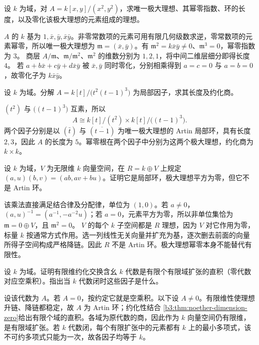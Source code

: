 \begin{exercise}\label{b3:ex:03-artin-square-example}
	设 \(k\) 为域，对 \(A=k[x,y]/(x^2,y^2)\)，求唯一极大理想、其幂零指数、环的长度，以及零化该极大理想的元素组成的理想。
\end{exercise}
\begin{solution}
	\(A\) 的 \(k\) 基为 \(1,\bar x,\bar y,\bar x\bar y\)。非零常数项的元素可用有限几何级数求逆，零常数项的元素幂零，所以唯一极大理想为 \(\mathfrak m=(\bar x,\bar y)\)。有 \(\mathfrak m^2=k\bar x\bar y\ne0\)、\(\mathfrak m^3=0\)，幂零指数为 \(3\)。 商层 \(A/\mathfrak m\)、\(\mathfrak m/\mathfrak m^2\)、\(\mathfrak m^2\) 的维数分别为 \(1,2,1\)，将中间二维层细分即得长度 \(4\)。 若 \(a+b\bar x+c\bar y+d\bar x\bar y\) 被 \(\bar x,\bar y\) 同时零化，分别相乘得到 \(a=c=0\) 与 \(a=b=0\)，故零化子为 \(k\bar x\bar y\)。
\end{solution}

\begin{exercise}\label{b3:ex:03-polynomial-artin-product}
	设 \(k\) 为域。分解 \(A=k[t]/\bigl(t^2(t-1)^3\bigr)\) 为局部因子，求其长度及约化商。
\end{exercise}
\begin{solution}
	\((t^2)\) 与 \(\bigl((t-1)^3\bigr)\) 互素，所以
	\[
		A\cong k[t]/(t^2)\times k[t]/\bigl((t-1)^3\bigr).
	\]
	两个因子分别是以 \((\bar t)\) 与 \((\overline{t-1})\) 为唯一极大理想的 Artin 局部环，具有长度 \(2,3\)，因此 \(A\) 的长度为 \(5\)。幂零根在两个因子中分别为这两个极大理想，约化商为 \(k\times k\)。
\end{solution}

\begin{exercise}\label{b3:ex:03-nilpotent-maximal-not-artin}
	设 \(k\) 为域，\(V\) 为无限维 \(k\) 向量空间，在 \(R=k\oplus V\) 上规定 \((a,u)(b,v)=(ab,av+bu)\)。证明它是局部环，极大理想平方为零，但它不是 Artin 环。
\end{exercise}
\begin{solution}
	该乘法直接满足结合律及分配律，单位为 \((1,0)\)。若 \(a\ne0\)， \((a,u)^{-1}=(a^{-1},-a^{-2}u)\)；若 \(a=0\)，元素平方为零，所以非单位集恰为 \(\mathfrak m=0\oplus V\)，且 \(\mathfrak m^2=0\)。 \(V\) 的每个 \(k\) 子空间都是 \(R\) 理想，因为 \(V\) 对它作用为零，标量 \(k\) 按通常方式作用。选一列线性无关向量并扩充为基，逐次删去前面的向量所得子空间构成严格降链。因此 \(R\) 不是 Artin 环。极大理想幂零本身不能替代有限性。
\end{solution}

\begin{exercise}\label{b3:ex:03-zero-dimensional-reduced}
	设 \(k\) 为域。证明有限维约化交换含幺 \(k\) 代数是有限个有限域扩张的直积（零代数对应空乘积）。指出当 \(k\) 代数闭时这些因子是什么。
\end{exercise}
\begin{solution}
	设该代数为 \(A\)。若 \(A=0\)，按约定它就是空乘积。以下设 \(A\ne0\)。有限维性使理想升链、降链都稳定，故 \(A\) 为 Artin 环；约化性结合 \cref{b3:thm:noether-dimension-zero}给出有限个域的直积。各域为原代数的商，因此作为 \(k\) 向量空间仍有限维，是有限域扩张。若 \(k\) 代数闭，每个有限扩张中的元素都有 \(k\) 上的最小多项式，该不可约多项式只能为一次，故各因子均等于 \(k\)。
\end{solution}

